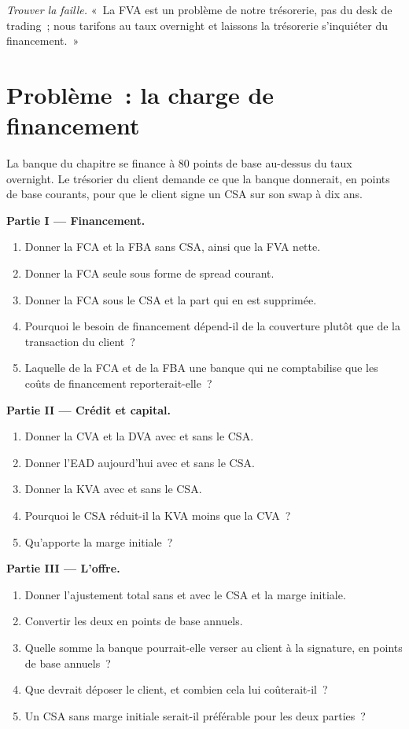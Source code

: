 \begin{exercise}[$\star\star\star$]\label{exo:rc:funding-margin-and-capital-adjustments:8}
\emph{Trouver la faille.} «~La FVA est un problème de notre trésorerie, pas du desk de trading~; nous tarifons au
taux overnight et laissons la trésorerie s'inquiéter du financement.~»
\end{exercise}

\section{Problème~: la charge de financement}

\begin{problem}\label{pb:rc:funding-margin-and-capital-adjustments:1}
La banque du chapitre se finance à 80 points de base au-dessus du taux overnight. Le trésorier du client
demande ce que la banque donnerait, en points de base courants, pour que le client signe un CSA
sur son swap à dix ans.

\medskip\noindent\textbf{Partie I --- Financement.}
\begin{enumerate}
\item Donner la FCA et la FBA sans CSA, ainsi que la FVA nette.
\item Donner la FCA seule sous forme de spread courant.
\item Donner la FCA sous le CSA et la part qui en est supprimée.
\item Pourquoi le besoin de financement dépend-il de la couverture plutôt que de la transaction du client~?
\item Laquelle de la FCA et de la FBA une banque qui ne comptabilise que les coûts de financement reporterait-elle~?
\end{enumerate}

\medskip\noindent\textbf{Partie II --- Crédit et capital.}
\begin{enumerate}[resume]
\item Donner la CVA et la DVA avec et sans le CSA.
\item Donner l'EAD aujourd'hui avec et sans le CSA.
\item Donner la KVA avec et sans le CSA.
\item Pourquoi le CSA réduit-il la KVA moins que la CVA~?
\item Qu'apporte la marge initiale~?
\end{enumerate}

\medskip\noindent\textbf{Partie III --- L'offre.}
\begin{enumerate}[resume]
\item Donner l'ajustement total sans et avec le CSA et la marge initiale.
\item Convertir les deux en points de base annuels.
\item Quelle somme la banque pourrait-elle verser au client à la signature, en points de base annuels~?
\item Que devrait déposer le client, et combien cela lui coûterait-il~?
\item Un CSA sans marge initiale serait-il préférable pour les deux parties~?
\end{enumerate}


\end{problem}
